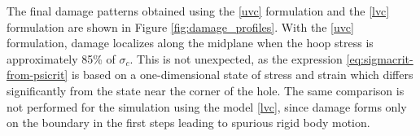 

The final damage patterns obtained using the \eqref{uvc} formulation and the \eqref{lvc} formulation  are shown in Figure \ref{fig:damage_profiles}. With the \eqref{uvc} formulation, damage localizes along the midplane when the hoop stress is approximately 85\% of $\sigma_c$.  This is not unexpected, as the expression \eqref{eq:sigmacrit-from-psicrit} is based on a one-dimensional state of stress and strain which differs significantly from the state near the corner of the hole.    The same comparison is not performed for the simulation using the model \eqref{lvc}, since damage forms only on the boundary in the first steps leading to spurious rigid body motion. 




